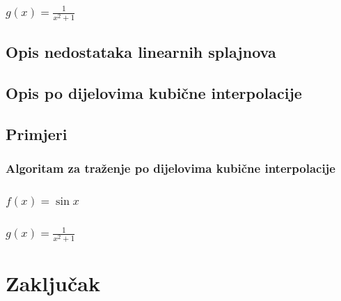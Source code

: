 \documentclass[12pt,a4paper]{report}
\begin{document}
		\subsection{$g(x)=\frac{1}{x^2 +1}$}
	\section{Opis nedostataka linearnih splajnova}
	\section{Opis po dijelovima kubične interpolacije}
	\section{Primjeri}
		\subsection{Algoritam za traženje po dijelovima kubične interpolacije}
		\subsection{$f(x)=\sin x$}
		\subsection{$g(x)=\frac{1}{x^2 +1}$}
\chapter{Zaključak}
\end{document}
